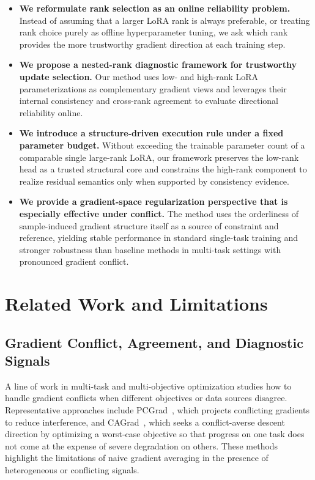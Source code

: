 \documentclass{article}
\begin{document}
\begin{itemize}

    \item \textbf{We reformulate rank selection as an online reliability problem.}
    Instead of assuming that a larger LoRA rank is always preferable, or
    treating rank choice purely as offline hyperparameter tuning, we ask which
    rank provides the more trustworthy gradient direction at each training step.

    \item \textbf{We propose a nested-rank diagnostic framework for trustworthy update selection.}
    Our method uses low- and high-rank LoRA parameterizations as complementary
    gradient views and leverages their internal consistency and cross-rank
    agreement to evaluate directional reliability online.

    \item \textbf{We introduce a structure-driven execution rule under a fixed parameter budget.}
    Without exceeding the trainable parameter count of a comparable
    single large-rank LoRA, our framework preserves the low-rank head as a
    trusted structural core and constrains the high-rank component to realize
    residual semantics only when supported by consistency evidence.

    \item \textbf{We provide a gradient-space regularization perspective that is especially effective under conflict.}
    The method uses the orderliness of sample-induced gradient structure itself
    as a source of constraint and reference, yielding stable performance in
    standard single-task training and stronger robustness than baseline methods
    in multi-task settings with pronounced gradient conflict.
\end{itemize}
\section{Related Work and Limitations}

\subsection{Gradient Conflict, Agreement, and Diagnostic Signals}

A line of work in multi-task and multi-objective optimization studies how to handle
gradient conflicts when different objectives or data sources disagree.
Representative approaches include PCGrad~\cite{yu2020pcgrad},
which projects conflicting gradients to reduce interference,
and CAGrad~\cite{liu2021cagrad}, which seeks a conflict-averse descent direction
by optimizing a worst-case objective so that progress on one task does not come
at the expense of severe degradation on others.
These methods highlight the limitations of naive gradient averaging
in the presence of heterogeneous or conflicting signals.
\end{document}

